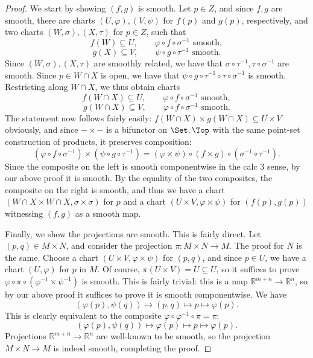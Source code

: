 \documentclass[11pt, letterpaper]{article}
\theoremstyle{theorem}
\begin{document}
\begin{proof}
	We start by showing $(f,g)$ is smooth. Let $p\in Z$, and since $f,g$ are smooth, there are charts $(U,\varphi ),(V,\psi )$ for $f(p)$ and $g(p)$, respectively, and two charts $(W,\sigma ),(X,\tau )$ for $p\in Z$, such that
	\[
		f(W)\subseteq U,\qquad \varphi \circ f\circ \sigma^{-1}  \text{ smooth},
	\]
	\[
		g(X)\subseteq V,\qquad \psi \circ g\circ \tau^{-1}  \text{ smooth} 
	.\]
	Since $(W,\sigma ),(X,\tau )$ are smoothly related, we have that $\sigma \circ \tau ^{-1} ,\tau \circ \sigma ^{-1} $ are smooth. Since $p\in W \cap X$ is open, we have that $\psi \circ g\circ \tau ^{-1} \circ \tau \circ \sigma ^{-1} $ is smooth. Restricting along $W \cap X$, we thus obtain charts
	\[
		f(W \cap X)\subseteq U,\qquad \varphi \circ f \circ \sigma ^{-1} \text{ smooth},
	\]
	\[
		g(W \cap X)\subseteq V,\qquad \varphi \circ f\circ \sigma ^{-1} \text{ smooth}
	.\]
	The statement now follows fairly easily: $f(W \cap X)\times g(W \cap X)\subseteq U\times V$ obviously, and since $-\times -$ is a bifunctor on $\Set ,\Top $ with the same point-set construction of products, it preserves composition:
	\[
		(\varphi \circ f\circ \sigma ^{-1} )\times (\psi \circ g\circ \tau ^{-1} )=(\varphi \times \psi )\circ (f\times g)\circ (\sigma ^{-1} \circ \tau ^{-1} )
	.\]
	Since the composite on the left is smooth componentwise in the calc 3 sense, by our above proof it is smooth. By the equality of the two composites, the composite on the right is smooth, and thus we have a chart $(W \cap X \times W \cap X,\sigma \times \sigma )$ for $p$ and a chart $(U\times V,\varphi \times \psi )$ for $(f(p),g(p))$ witnessing $(f,g)$ as a smooth map.

	Finally, we show the projections are smooth. This is fairly direct. Let $(p,q)\in M\times N$, and consider the projection $\pi : M\times N \to M$. The proof for $N$ is the same. Choose a chart $(U\times V,\varphi \times \psi )$ for $(p,q)$, and since $p\in U$, we have a chart $(U,\varphi )$ for $p$ in $M$. Of course, $\pi (U\times V)=U\subseteq U$, so it suffices to prove $\varphi \circ \pi \circ (\varphi ^{-1} \times \psi ^{-1} )$ is smooth. This is fairly trivial: this is a map $\mathbb{R} ^{m+n} \to \mathbb{R} ^n$, so by our above proof it suffices to prove it is smooth componentwise. We have
	\[
		(\varphi (p),\psi (q))\mapsto (p,q)\mapsto p\mapsto \varphi (p)
	.\]
	This is clearly equivalent to the composite $\varphi \circ \varphi ^{-1} \circ \pi =\pi $:
	\[
		(\varphi (p),\psi (q))\mapsto \varphi (p)\mapsto p\mapsto \varphi (p)
	.\]
	Projections $\mathbb{R} ^{m+n} \to \mathbb{R} ^n$ are well-known to be smooth, so the projection $M\times N\to M$ is indeed smooth, completing the proof.
\end{proof}
\end{document}
